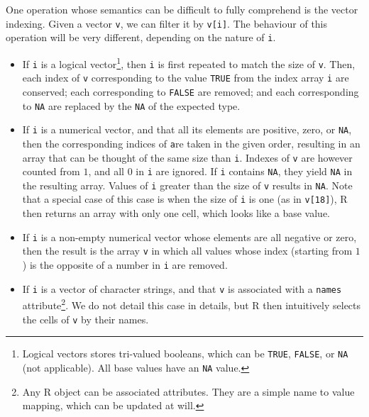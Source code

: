 \documentclass{article}
\newcommand\R{R}
\begin{document}
One operation whose semantics can be difficult
to fully comprehend is the vector indexing.
Given a vector \texttt{v},
we can filter it by \texttt{v[i]}.
The behaviour of this operation will be very different,
depending on the nature of \texttt{i}.
\begin{itemize}
    \item If \texttt{i} is a logical vector\footnote{
          Logical vectors stores tri-valued booleans,
          which can be \texttt{TRUE}, \texttt{FALSE},
          or \texttt{NA} (not applicable).
          All base values have an \texttt{NA} value.
      }, then \texttt{i} is first repeated
      to match the size of \texttt{v}.
      Then, each index of \texttt{v} corresponding
      to the value \texttt{TRUE} from the index array \texttt{i}
      are conserved;
      each corresponding to \texttt{FALSE} are removed;
      and each corresponding to \texttt{NA} are replaced
      by the \texttt{NA} of the expected type.
    \item If \texttt{i} is a numerical vector,
      and that all its elements are positive, zero, or \texttt{NA},
      then the corresponding indices of \texttt
      are taken in the given order, resulting in an array
      that can be thought of the same size than \texttt{i}.
      Indexes of \texttt{v} are however counted from
      \(1\), and all \(0\) in \texttt{i} are ignored.
      If \texttt{i} contains \texttt{NA},
      they yield \texttt{NA} in the resulting array.
      Values of \texttt{i} greater than the size of \texttt{v}
      results in \texttt{NA}.
        Note that a special case of this case is when the size of \texttt{i}
      is one (as in \texttt{v[18]}),
      \R{} then returns an array with only one cell,
      which looks like a base value.
    \item If \texttt{i} is a non-empty numerical vector
      whose elements are all negative or zero,
      then the result is the array \texttt{v}
      in which all values whose index (starting from \(1\))
      is the opposite of a number in \texttt{i} are removed.
    \item If \texttt{i} is a vector of character strings,
      and that \texttt{v} is associated with a \texttt{names}
      attribute\footnote{
          Any \R{} object can be associated attributes.
          They are a simple name to value mapping,
          which can be updated at will.
      }.
      We do not detail this case in details,
      but \R{} then intuitively selects the cells of \texttt{v}
      by their names.
\end{itemize}
\end{document}
